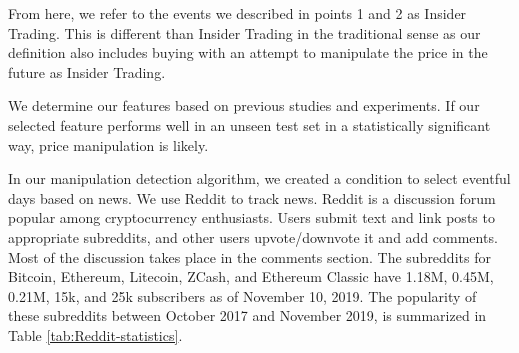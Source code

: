 \documentclass[letterpaper]{article}
\begin{document}
From here, we refer to the events we described in points 1 and 2 as Insider Trading. This is different than 
Insider Trading in the traditional sense as our definition also includes buying with an 
attempt to manipulate the price in the future as Insider Trading. \par

We determine our features based on previous studies and experiments. If our selected 
feature performs well in an unseen test set in a statistically significant way, price manipulation is likely. \par

In our manipulation detection algorithm, we created a condition to select eventful days based on news. 
We use Reddit to track news. Reddit is a discussion forum popular among cryptocurrency enthusiasts. Users 
 submit text and link posts to 
appropriate subreddits, and other users upvote/downvote it and add comments. Most of the discussion 
takes place in the comments section. The 
subreddits for Bitcoin, Ethereum, Litecoin, ZCash, and Ethereum Classic have 1.18M, 0.45M, 0.21M, 15k, and 25k 
subscribers as of November 10, 2019. The popularity of these subreddits between October 2017 and November 2019, 
is summarized in Table \ref{tab:Reddit-statistics}. 
\end{document}
